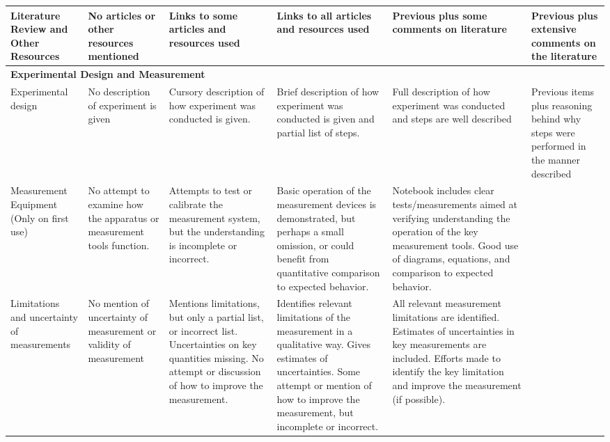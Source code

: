 \documentclass[10pt, letterpaper]{article}
\begin{document}
\begin{landscape}
\begin{tabular}{|p{2cm}|p{4cm}|p{4.5cm}| p{5cm}|p{5.4cm}| p{3.5cm}|}
            Literature Review and Other Resources & No articles or other resources mentioned & Links to some articles and resources used & Links to all articles and resources used & Previous plus some comments on literature & Previous plus extensive comments on the literature \\ \hline
 
            \multicolumn{6}{|l|}{\textbf{Experimental Design and Measurement}}\\ \hline
 
            \multicolumn{1}{|p{2cm}|}{Experimental design} & No description of experiment is given & Cursory description of how experiment was conducted is given. & Brief description of how experiment was conducted is given and partial list of steps. & Full description of how experiment was conducted and steps are well described & Previous items plus reasoning behind why steps were performed in the manner described \\ \hline
 
            Measurement Equipment (Only on first use) & No attempt to examine how the apparatus or measurement tools function. & Attempts to test or calibrate   the measurement system, but the understanding is incomplete or incorrect. & Basic  operation   of  the measurement devices is  demonstrated,   but perhaps a   small   omission,   or  could   benefit from quantitative comparison to expected behavior.  & Notebook  includes clear  tests/measurements aimed    at  verifying   understanding   the operation   of  the key measurement tools.      Good    use of  diagrams,   equations,  and comparison  to  expected    behavior. & \\ \hline

            Limitations and uncertainty of measurements & No mention of uncertainty of measurement or validity of measurement & Mentions    limitations,    but only    a   partial list,   or  incorrect   list. Uncertainties on  key quantities  missing.        No  attempt or  discussion  of  how to  improve the measurement. & Identifies relevant  limitations of  the measurement in  a   qualitative way.        Gives   estimates   of  uncertainties.      Some    attempt or  mention of how  to  improve the measurement,    but incomplete  or  incorrect. & All    relevant    measurement limitations are identified. Estimates   of uncertainties    in  key measurements    are included. Efforts   made    to  identify    the key limitation  and improve the measurement (if possible). & \\ \hline


\end{tabular}
\end{landscape}
\end{document}
